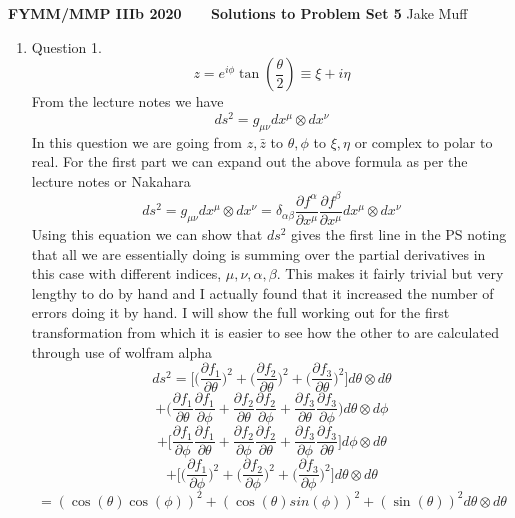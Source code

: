 \documentclass[12pt]{article}
\newcommand{\zbar}{\bar{z}}
\begin{document}
\normalsize

\baselineskip 14pt

\begin{center}
{\Large {\bf FYMM/MMP IIIb 2020 \ \ \  Solutions to Problem Set 5}}
Jake Muff
\end{center}

\begin{enumerate}

\item Question 1. 
$$ z = e^{i \phi} \tan(\frac{\theta}{2}) \equiv \xi + i \eta $$
From the lecture notes we have 
$$ ds^2 = g_{\mu \nu} dx^{\mu} \otimes dx^{\nu} $$
In this question we are going from $z,\zbar$ to $\theta, \phi$ to $\xi, \eta$ or complex to polar to real. For the first part we can expand out the above formula as per the lecture notes or Nakahara 
\begin{equation}
 ds^2 = g_{\mu \nu} dx^{\mu} \otimes dx^{\nu} = \delta_{\alpha \beta} \frac{\partial f^{\alpha}}{\partial x^{\mu}} \frac{\partial f^{\beta}}{\partial x^{\mu}} dx^{\mu} \otimes dx^{\nu} 
\end{equation}
Using this equation we can show that $ds^2$ gives the first line in the PS noting that all we are essentially doing is summing over the partial derivatives in this case with different indices, $\mu, \nu, \alpha, \beta$. This makes it fairly trivial but very lengthy to do by hand and I actually found that it increased the number of errors doing it by hand. I will show the full working out for the first transformation from which it is easier to see how the other to are calculated through use of wolfram alpha 
$$ ds^2 = \Big[ \big( \frac{\partial f_1}{\partial \theta} \big)^2 + \big( \frac{\partial f_2}{\partial \theta} \big)^2 + \big( \frac{\partial f_3}{\partial \theta} \big)^2 \Big] d \theta \otimes d \theta $$
$$ + \Big( \frac{\partial f_1}{\partial \theta } \frac{\partial f_1}{\partial \phi} + \frac{\partial f_2}{\partial \theta} \frac{\partial f_2 }{\partial \phi} + \frac{\partial f_3}{\partial \theta} \frac{\partial f_3}{\partial \phi} \Big) d \theta \otimes d \phi $$
$$ + \Big[ \frac{\partial f_1}{\partial \phi} \frac{\partial f_1 }{\partial \theta} + \frac{\partial f_2}{\partial \phi} \frac{\partial f_2}{\partial \theta} + \frac{\partial f_3}{\partial \phi} \frac{\partial f_3}{\partial \theta} \Big] d \phi \otimes d \theta $$
$$ + \Big[ \big( \frac{\partial f_1}{\partial \phi} \big)^2 + \big( \frac{\partial f_2}{\partial \phi} \big)^2 + \big( \frac{\partial f_3}{\partial \phi} \big)^2 \Big] d \theta \otimes d \theta $$
$$ = ( \cos(\theta) \cos (\phi))^2 + (\cos(\theta) sin(\phi) )^2 + (\sin(\theta))^2 d \theta \otimes d \theta $$

\end{enumerate}
\end{document}
